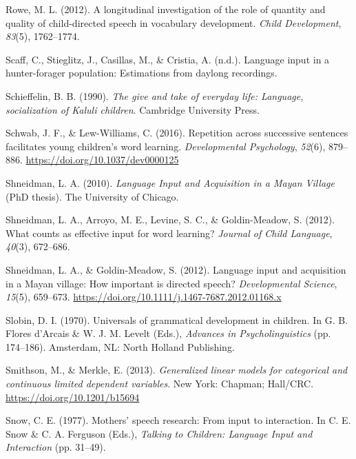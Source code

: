 \documentclass[
  english,
  ,man,floatsintext]{apa6}
\begin{document}
\leavevmode\hypertarget{ref-rowe2012longitudinal}{}%
Rowe, M. L. (2012). A longitudinal investigation of the role of quantity and quality of child-directed speech in vocabulary development. \emph{Child Development}, \emph{83}(5), 1762--1774.

\leavevmode\hypertarget{ref-scaffIPlanguage}{}%
Scaff, C., Stieglitz, J., Casillas, M., \& Cristia, A. (n.d.). Language input in a hunter-forager population: Estimations from daylong recordings.

\leavevmode\hypertarget{ref-schieffelin1990give}{}%
Schieffelin, B. B. (1990). \emph{The give and take of everyday life: Language, socialization of Kaluli children}. Cambridge University Press.

\leavevmode\hypertarget{ref-schwab2016repetition}{}%
Schwab, J. F., \& Lew-Williams, C. (2016). Repetition across successive sentences facilitates young children's word learning. \emph{Developmental Psychology}, \emph{52}(6), 879--886. \url{https://doi.org/10.1037/dev0000125}

\leavevmode\hypertarget{ref-shneidman2010language}{}%
Shneidman, L. A. (2010). \emph{Language Input and Acquisition in a Mayan Village} (PhD thesis). The University of Chicago.

\leavevmode\hypertarget{ref-shneidman2012counts}{}%
Shneidman, L. A., Arroyo, M. E., Levine, S. C., \& Goldin-Meadow, S. (2012). What counts as effective input for word learning? \emph{Journal of Child Language}, \emph{40}(3), 672--686.

\leavevmode\hypertarget{ref-shneidman2012language}{}%
Shneidman, L. A., \& Goldin-Meadow, S. (2012). Language input and acquisition in a Mayan village: How important is directed speech? \emph{Developmental Science}, \emph{15}(5), 659--673. \url{https://doi.org/10.1111/j.1467-7687.2012.01168.x}

\leavevmode\hypertarget{ref-slobin1970universals}{}%
Slobin, D. I. (1970). Universals of grammatical development in children. In G. B. Flores d'Arcais \& W. J. M. Levelt (Eds.), \emph{Advances in Psycholinguistics} (pp. 174--186). Amsterdam, NL: North Holland Publishing.

\leavevmode\hypertarget{ref-smithson2013generalized}{}%
Smithson, M., \& Merkle, E. (2013). \emph{Generalized linear models for categorical and continuous limited dependent variables}. New York: Chapman; Hall/CRC. \url{https://doi.org/10.1201/b15694}

\leavevmode\hypertarget{ref-snow1977mothers}{}%
Snow, C. E. (1977). Mothers' speech research: From input to interaction. In C. E. Snow \& C. A. Ferguson (Eds.), \emph{Talking to Children: Language Input and Interaction} (pp. 31--49).
\end{document}
